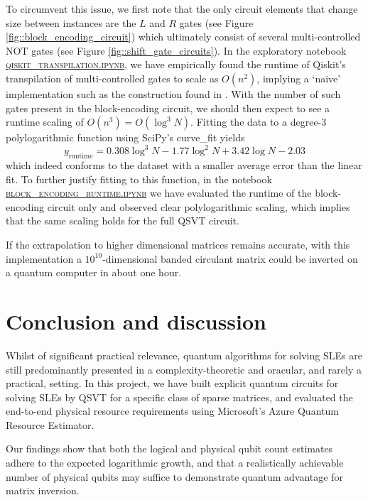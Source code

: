 \documentclass[10pt, twocolumn]{article}
\begin{document}
To circumvent this issue, we first note that the only circuit elements that change size between instances are the $L$ and $R$ gates (see Figure \ref{fig::block_encoding_circuit}) which ultimately consist of several multi-controlled \textsc{NOT} gates (see Figure \ref{fig::shift_gate_circuits}). In the exploratory notebook \href{https://github.com/Walden-Killick/QCE24-QRE-Challenge/blob/main/notebooks/exploration/qiskit_transpilation.ipynb}{\textsc{qiskit\_transpilation.ipynb}}, we have empirically found the runtime of Qiskit's transpilation of multi-controlled gates to scale as $O(n^2)$, implying a `naive' implementation such as the construction found in \cite{barenco1995elementary}. With the number of such gates present in the block-encoding circuit, we should then expect to see a runtime scaling of $O(n^3) = O(\log^3{N})$. Fitting the data to a degree-3 polylogarithmic function using SciPy's curve\_fit yields
\[
	y_\text{runtime} = 0.308 \log^3{N} - 1.77 \log^2{N} + 3.42 \log{N} - 2.03
\]
which indeed conforms to the dataset with a smaller average error than the linear fit. To further justify fitting to this function, in the notebook \href{https://github.com/Walden-Killick/QCE24-QRE-Challenge/blob/main/notebooks/result_plotting/block_encoding_runtime.ipynb}{\textsc{block\_encoding\_runtime.ipynb}} we have evaluated the runtime of the block-encoding circuit only and observed clear polylogarithmic scaling, which implies that the same scaling holds for the full QSVT circuit.

If the extrapolation to higher dimensional matrices remains accurate, with this implementation a $10^{10}$-dimensional banded circulant matrix could be inverted on a quantum computer in about one hour.

\section{Conclusion and discussion}

Whilst of significant practical relevance, quantum algorithms for solving SLEs are still predominantly presented in a complexity-theoretic and oracular, and rarely a practical, setting. In this project, we have built explicit quantum circuits for solving SLEs by QSVT for a specific class of sparse matrices, and evaluated the end-to-end physical resource requirements using Microsoft's Azure Quantum Resource Estimator.

Our findings show that both the logical and physical qubit count estimates adhere to the expected logarithmic growth, and that a realistically achievable number of physical qubits may suffice to demonstrate quantum advantage for matrix inversion.
\end{document}
